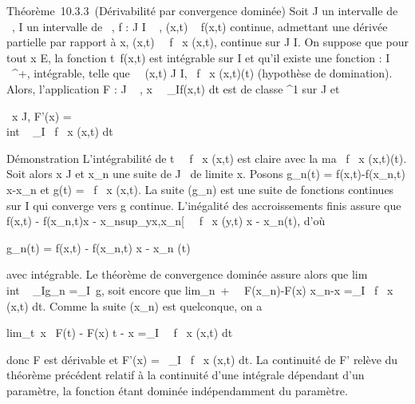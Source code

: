 \documentclass[]{article}
\begin{document}
Théorème~10.3.3~(Dérivabilité par convergence dominée) Soit J un
intervalle de ~, I un intervalle de ~, f : J \times I \rightarrow~ , (x,t) \rightarrow~ f(x,t)
continue, admettant une dérivée partielle par rapport à x,
(x,t)\mapsto~ \partial~f \over \partial~x (x,t),
continue sur J \times I. On suppose que pour tout x \in E, la fonction
t\mapsto~f(x,t) est intégrable sur I et qu'il existe
une fonction \phi : I \rightarrow~ ~^+, intégrable, telle que
\forall~~(x,t) \in J \times I, \textbar{} \partial~f
\over \partial~x (x,t)\textbar{}\leq \phi(t) (hypothèse de
domination). Alors, l'application F : J \rightarrow~ ,
x\mapsto~\int ~
\_If(x,t) dt est de classe ^1 sur J et

\forall~x \in J, F'(x) =\\int ~
\_I \partial~f \over \partial~x (x,t) dt

Démonstration L'intégrabilité de t\mapsto~ \partial~f
\over \partial~x (x,t) est claire avec la ma\jmathoration
\textbar{} \partial~f \over \partial~x (x,t)\textbar{}\leq \phi(t). Soit
alors x \in J et x\_n une suite de J
\diagdown\x\ de limite x. Posons
g\_n(t) = f(x,t)-f(x\_n,t) \over
x-x\_n et g(t) = \partial~f \over \partial~x (x,t). La
suite (g\_n) est une suite de fonctions continues sur I qui
converge vers g continue. L'inégalité des accroissements finis assure
que \textbar{}f(x,t) - f(x\_n,t)\textbar{}\leq\textbar{}x -
x\_n\textbar{}sup\_y\in{]}x,x\_n{[}~\left
\textbar{} \partial~f \over \partial~x (y,t)\right
\textbar{}\leq\textbar{}x - x\_n\textbar{}\phi(t), d'où

\textbar{}g\_n(t)\textbar{} = \left \textbar{}
f(x,t) - f(x\_n,t) \over x - x\_n
\right \textbar{}\leq \phi(t)

avec \phi intégrable. Le théorème de convergence dominée assure alors que
lim\\int ~
\_Ig\_n =\int  \_I~g, soit
encore que lim\_n\rightarrow~+\infty~~
F(x\_n)-F(x) \over x\_n-x
=\int  \_I \partial~f \over \partial~x~
(x,t) dt. Comme la suite (x\_n) est quelconque, on a

lim\_t\rightarrow~x~ F(t) - F(x)
\over t - x =\int  \_I~
\partial~f \over \partial~x (x,t) dt

donc F est dérivable et F'(x) =\int ~
\_I \partial~f \over \partial~x (x,t) dt. La continuité de F'
relève du théorème précédent relatif à la continuité d'une intégrale
dépendant d'un paramètre, la fonction étant dominée indépendamment du
paramètre.
\end{document}

